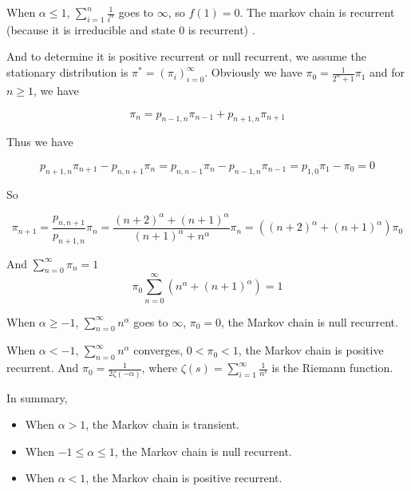 \documentclass{article}
\begin{document}
When $\alpha\leqslant 1$, $\sum_{i=1}^n \frac{1}{i^\alpha}$ goes to $\infty$, so $f(1) = 0$. The markov chain is recurrent (because it is irreducible and state $0$ is recurrent) .

And to determine it is positive recurrent or null recurrent, we assume the stationary distribution is $\pi^* = (\pi_i)_{i=0}^{\infty}$. Obviously we have $\pi_0 = \frac{1}{2^{\alpha}+1} \pi_1$ and for $n\geqslant 1$, we have 

\begin{equation}
    \pi_n = p_{n-1,n}\pi_{n-1} + p_{n+1,n}\pi_{n+1} 
\end{equation}

Thus we have 

\begin{equation}
    p_{n+1,n} \pi_{n+1} - p_{n,n+1}  \pi_{n} = p_{n,n-1} \pi_{n} - p_{n-1,n}  \pi_{n-1} = p_{1,0} \pi_{1} - \pi_{0} = 0
\end{equation}

So 

\begin{equation}
    \pi_{n+1} = \frac{p_{n,n+1}}{p_{n+1,n}} \pi_{n} = \frac{(n+2)^\alpha + (n+1)^\alpha}{(n+1)^\alpha + n^\alpha} \pi_{n} = ((n+2)^{\alpha} +(n+1)^\alpha) \pi_{0}
\end{equation}

And $\sum_{n=0}^{\infty} \pi_{n}= 1$
\begin{equation}
    \pi_0 \sum_{n=0}^{\infty} (n^\alpha + (n+1)^{\alpha}) = 1
\end{equation}

When $\alpha \geqslant -1$, $\sum_{n=0}^{\infty} n^\alpha $ goes to $\infty$, $\pi_0 = 0$, the Markov chain is null recurrent.

When $\alpha < -1$, $\sum_{n=0}^{\infty} n^\alpha $ converges, $0<\pi_0 < 1$, the Markov chain is positive recurrent. And $\pi_0  = \frac{1}{2\zeta(-\alpha) }$, where $\zeta(s) = \sum_{i=1}^{\infty} \frac{1}{n^s}$ is the Riemann function.

In summary,

\begin{itemize}
    \item When $\alpha> 1$, the Markov chain is transient.
    \item When $-1 \leqslant \alpha \leqslant 1$, the Markov chain is null recurrent.
    \item When $\alpha < 1$, the Markov chain is positive recurrent.
\end{itemize}
\end{document}

